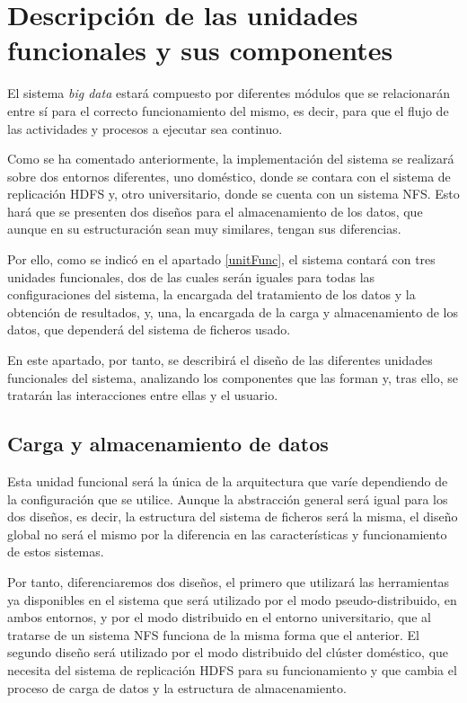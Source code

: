 \section{Descripción de las unidades funcionales y sus componentes}
El sistema \textit{big data} estará compuesto por diferentes módulos que se relacionarán entre sí para el correcto funcionamiento del mismo, es decir, para que el flujo de las actividades y procesos a ejecutar sea continuo.

Como se ha comentado anteriormente, la implementación del sistema se realizará sobre dos entornos diferentes, uno doméstico, donde se contara con el sistema de replicación \gls{HDFS} y, otro universitario, donde se cuenta con un sistema \gls{NFS}. Esto hará que se presenten dos diseños para el almacenamiento de los datos, que aunque en su estructuración sean muy similares, tengan sus diferencias.

Por ello, como se indicó en el apartado \ref{unitFunc}, el sistema contará con tres unidades funcionales, dos de las cuales serán iguales para todas las configuraciones del sistema, la encargada del tratamiento de los datos y la obtención de resultados, y, una, la encargada de la carga y almacenamiento de los datos, que dependerá del sistema de ficheros usado.

En este apartado, por tanto, se describirá el diseño de las diferentes unidades funcionales del sistema, analizando los componentes que las forman y, tras ello, se tratarán las interacciones entre ellas y el usuario.

\subsection{Carga y almacenamiento de datos \label{diseñoFich}}
Esta unidad funcional será la única de la arquitectura que varíe dependiendo de la configuración que se utilice. Aunque la abstracción general será igual para los dos diseños, es decir, la estructura del sistema de ficheros será la misma, el diseño global no será el mismo por la diferencia en las características y funcionamiento de estos sistemas. 

Por tanto, diferenciaremos dos diseños, el primero que utilizará las herramientas ya disponibles en el sistema que será utilizado por el modo pseudo-distribuido, en ambos entornos, y por el modo distribuido en el entorno universitario, que al tratarse de un sistema \gls{NFS} funciona de la misma forma que el anterior. El segundo diseño será utilizado por el modo distribuido del clúster doméstico, que necesita del sistema de replicación \gls{HDFS} para su funcionamiento y que cambia el proceso de carga de datos y la estructura de almacenamiento.

